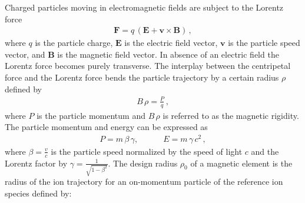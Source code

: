 Charged particles moving in electromagnetic fields are subject to the Lorentz force~\cite{griffiths13}
\begin{align}
\mathbf{F} = q \, ( \mathbf{E} + \mathbf{v} \times \mathbf{B} ) \, ,
\end{align} 
where $q$ is the particle charge, $\mathbf{E}$ is the electric field vector, $\mathbf{v}$ is the particle speed vector, and $\mathbf{B}$ is the magnetic field vector. In absence of an electric field the Lorentz force becomes purely transverse. The interplay between the centripetal force and the Lorentz force bends the particle trajectory by a certain radius $\rho$ defined by~\cite{wiedemann1999particle}
\begin{align}
B \, \rho = \frac{P}{q} \, , \label{eq:rigidity}
\end{align}  
where $P$ is the particle momentum and $B \, \rho$ is referred to as the magnetic rigidity. The particle momentum and energy can be expressed as
\begin{align}
P = m \, \beta \, \gamma, \quad \quad \quad E = m \, \gamma \, c^2 \, ,
\end{align}
where $\beta=\frac{v}{c}$ is the particle speed normalized by the speed of light $c$ and the Lorentz factor by $\gamma = \frac{1}{\sqrt{1-\beta^2}}$. The design radius $\rho_0$ of a magnetic element is the radius of the ion trajectory for an on-momentum particle of the reference ion species defined by:


